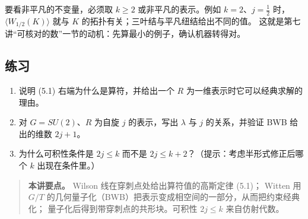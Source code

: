 要看非平凡的不变量，必须取 $k\ge2$ 或非平凡的表示。例如 $k=2$、$j=\frac12$ 时，
$\langle W_{1/2}(K)\rangle$ 就与 $K$ 的拓扑有关；三叶结与平凡纽结给出不同的值。
这就是第七讲“可核对的数”一节的动机：先算最小的例子，确认机器转得对。

\subsection*{练习}
\begin{enumerate}[leftmargin=*]
  \item 说明 (5.1) 右端为什么是算符，并给出一个 $R$ 为一维表示时它可以经典求解的理由。
  \item 对 $G=SU(2)$、$R$ 为自旋 $j$ 的表示，写出 $\lambda$ 与 $j$ 的关系，并验证 BWB 给出的维数 $2j+1$。
  \item 为什么可积性条件是 $2j\le k$ 而不是 $2j\le k+2$？（提示：考虑半形式修正后哪个 $k$ 出现在条件里。）
\end{enumerate}

\begin{quote}
\small
\textbf{本讲要点。} Wilson 线在穿刺点处给出算符值的高斯定律 (5.1)；
Witten 用 $G/T$ 的几何量子化（BWB）把表示变成相空间的一部分，从而把约束经典化；
量子化后得到带穿刺点的共形块。可积性 $2j\le k$ 来自仿射代数。
\end{quote}
